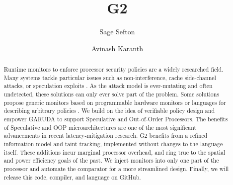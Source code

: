 \documentclass[sigconf,usenames,dvipsnames,svgnames,table]{acmart}
\def \sysname {\textsc{G2}\xspace}
\def \oldname {\textsc{GARUDA}\xspace}
\begin{document}

\title{\sysname}


\author{Sage Sefton}

\author{Avinash Karanth}


\renewcommand{\shortauthors}{Sefton and Karanth}

\begin{abstract}

Runtime monitors to enforce processor security policies are a widely researched field.
Many systems tackle particular issues such as non-interference, cache side-channel attacks, or speculation exploits \cite{2017secverilogbl, 2019stt}.
As the attack model is ever-mutating and often undetected, these solutions can only ever solve part of the problem.
Some solutions propose generic monitors based on programmable hardware monitors \cite{2014pump} or languages for describing arbitrary policies \cite{2018garuda, 2014netkat}.
We build on the idea of verifiable policy design and empower \oldname to support Speculative and Out-of-Order Processors.
The benefits of Speculative and OOP microarchitectures are one of the most significant advancements in recent latency-mitigation research.
\sysname benefits from a refined information model and taint tracking, implemented without changes to the language itself.
These additions incur marginal processor overhead, and ring true to the spatial and power efficiency goals of the past.
We inject monitors into only one part of the processor and automate the comparator for a more streamlined design.
Finally, we will release this code, compiler, and language on GitHub.

\end{abstract}
\end{document}
